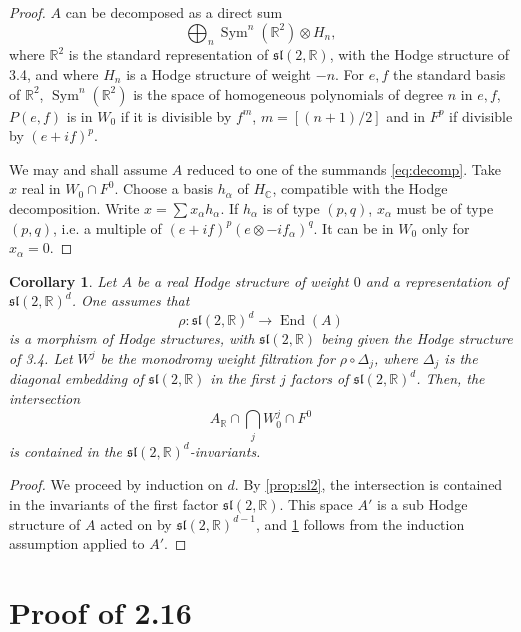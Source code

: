 \documentclass[11pt,a4paper]{article}
\theoremstyle{plain}
\newtheorem{corollary}[theorem]{Corollary}
\theoremstyle{definition}
\DeclareMathOperator{\End}{End}
\DeclareMathOperator{\Sym}{Sym}
\begin{document}
\begin{proof}
$A$ can be decomposed as a direct sum
\begin{equation}\label{eq:decomp}
\bigoplus_n\Sym^n(\mathbb{R}^2)\otimes H_n,
\end{equation}
where $\mathbb{R}^2$ is the standard representation of $\mathfrak{sl}(2,\mathbb{R})$, with the Hodge structure of 3.4, and where $H_n$ is a Hodge structure of weight $-n$. For $e,f$ the standard basis of $\mathbb{R}^2$, $\Sym^n(\mathbb{R}^2)$ is the space of homogeneous polynomials of degree $n$ in $e,f$, $P(e,f)$ is in $W_0$ if it is divisible by $f^m$, $m=[(n+1)/2]$ and in $F^p$ if divisible by $(e+if)^p$.

We may and shall assume $A$ reduced to one of the summands \eqref{eq:decomp}. Take $x$ real in $W_0\cap F^0$. Choose a basis $h_{\alpha}$ of $H_{\mathbb{C}}$, compatible with the Hodge decomposition. Write $x=\sum x_{\alpha} h_{\alpha}$. If $h_{\alpha}$ is of type $(p,q)$, $x_{\alpha}$ must be of type $(p,q)$, i.e. a multiple of $(e+if)^p(e\otimes-if_{\alpha})^q$. It can be in $W_0$ only for $x_{\alpha}=0$.
\end{proof}

\begin{corollary}\label{cor:sl2d}
Let $A$ be a real Hodge structure of weight $0$ and a representation of $\mathfrak{sl}(2,\mathbb{R})^d$. One assumes that
\[
\rho:\mathfrak{sl}(2,\mathbb{R})^d\to\End(A)
\]
is a morphism of Hodge structures, with $\mathfrak{sl}(2,\mathbb{R})$ being given the Hodge structure of 3.4. Let $W^j$ be the monodromy weight filtration for $\rho\circ\Delta_j$, where $\Delta_j$ is the diagonal embedding of $\mathfrak{sl}(2,\mathbb{R})$ in the first $j$ factors of $\mathfrak{sl}(2,\mathbb{R})^d$. Then, the intersection
\[
A_{\mathbb{R}}\cap\bigcap_j W^j_0\cap F^0
\]
is contained in the $\mathfrak{sl}(2,\mathbb{R})^d$-invariants.
\end{corollary}

\begin{proof}
We proceed by induction on $d$. By \ref{prop:sl2}, the intersection is contained in the invariants of the first factor $\mathfrak{sl}(2,\mathbb{R})$. This space $A'$ is a sub Hodge structure of $A$ acted on by $\mathfrak{sl}(2,\mathbb{R})^{d-1}$, and \ref{cor:sl2d} follows from the induction assumption applied to $A'$.
\end{proof}


\section{Proof of 2.16}
\end{document}
